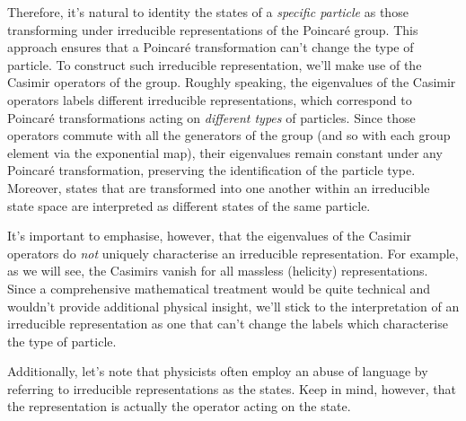Therefore, it's natural to identity the states of a \emph{specific particle} as those transforming under irreducible representations of the Poincaré group. This approach ensures that a Poincaré transformation can't change the type of particle. To construct such irreducible representation, we'll make use of the Casimir operators of the group. Roughly speaking, the eigenvalues of the Casimir operators labels different irreducible representations, which correspond to Poincaré transformations acting on \emph{different types} of particles. Since those operators commute with all the generators of the group (and so with each group element via the exponential map), their eigenvalues remain constant under any Poincaré transformation, preserving the identification of the particle type. Moreover, states that are transformed into one another within an irreducible state space are interpreted as different states of the same particle.

It's important to emphasise, however, that the eigenvalues of the Casimir operators do \emph{not} uniquely characterise an irreducible representation. For example, as we will see, the Casimirs vanish for all massless (helicity) representations. Since a comprehensive mathematical treatment would be quite technical and wouldn't provide additional physical insight, we'll stick to the interpretation of an irreducible representation as one that can't change the labels which characterise the type of particle. 

Additionally, let's note that physicists often employ an abuse of language by referring to irreducible representations as the states. Keep in mind, however, that the representation is actually the operator acting on the state.

